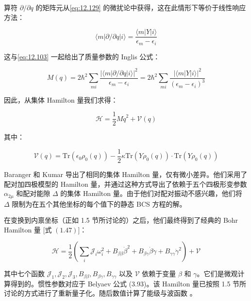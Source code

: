 算符 $\partial/\partial q$ 的矩阵元从\ref{eq:12.129} 的微扰论中获得，这在此情形下等价于线性响应方法：

\begin{equation}
\langle m|\partial/\partial q|i\rangle=\frac{\langle m|Y|i\rangle}{\epsilon_{m}-\epsilon_{i}}\label{eq:12.132}
\end{equation}

这与\ref{eq:12.103} 一起给出了质量参数的 Inglis 公式：

\begin{equation}
M(q)=2\hbar^{2}\sum_{mi}\frac{|\langle m|\partial/\partial q|i\rangle|^{2}}{\epsilon_{m}-\epsilon_{i}}=2\hbar^{2}\sum_{mi}\frac{|\langle m|Y|i\rangle|^{2}}{(\epsilon_{m}-\epsilon_{i})^{3}}\label{eq:12.133}
\end{equation}

因此，从集体 Hamilton 量我们求得：

\begin{equation}
\mathcal{H}=\frac{1}{2}M\dot{q}^{2}+\mathcal{V}(q)\label{eq:12.134}
\end{equation}

其中：

\begin{equation}
\mathcal{V}(q)=\mathrm{Tr}(\epsilon_{0}\rho_{0}(q))-\frac{1}{2}\kappa\mathrm{Tr}(Y\rho_{0}(q))\cdot\mathrm{Tr}(Y\rho_{0}(q))\label{eq:12.135}
\end{equation}

Baranger 和 Kumar \cite{BK68} 导出了相同的集体 Hamilton 量，仅有微小差异。他们采用了配对加四极模型的
Hamilton 量，并通过这种方式导出了依赖于五个四极形变参数 $\alpha_{2\mu}$ 和配对能隙 $\Delta$
的集体 Hamilton 量。由于他们对配对振动不感兴趣，他们将 $\Delta$ 限制为在五个其他坐标的每个值下的静态 BCS
方程的解。

在变换到内禀坐标（正如 1.5 节所讨论的）之后，他们最终得到了经典的 Bohr Hamilton 量 {[}式 $(1.47)${]}：

\begin{equation}
\mathcal{H}=\frac{1}{2}\left(\sum_{i}\mathcal{J}_{i}\omega^{2}_{i}+B_{\beta\beta}\dot{\beta}^{2}+B_{\beta\gamma}\dot{\beta}\dot{\gamma}+B_{\gamma\gamma}\dot{\gamma}^{2}\right)+\mathcal{V}\label{eq:12.136}
\end{equation}

其中七个函数 $\mathcal{J}_{1},\mathcal{J}_{2},\mathcal{J}_{3},B_{\beta\beta},B_{\beta\gamma},B_{\gamma\gamma}$
以及 $\mathcal{V}$ 依赖于变量 $\beta$ 和 $\gamma$。它们是微观计算得到的。惯性参数对应于 Belyaev
公式 (3.93)。该 Hamilton 量已按照 1.5 节所讨论的方式进行了重新量子化。随后数值计算了能级与波函数 \cite{BK67b,BK68}。

